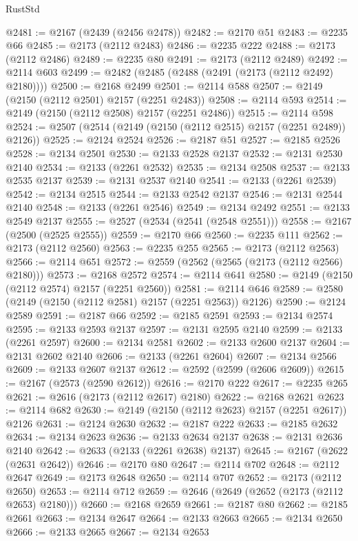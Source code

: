 \begin{lexlean}{RustStd}
\begin{coremodule}
@2481 := @2167 (@2439 (@2456 @2478))
@2482 := @2170 @51
@2483 := @2235 @66
@2485 := @2173 (@2112 @2483)
@2486 := @2235 @222
@2488 := @2173 (@2112 @2486)
@2489 := @2235 @80
@2491 := @2173 (@2112 @2489)
@2492 := @2114 @603
@2499 := @2482 (@2485 (@2488 (@2491 (@2173 (@2112 @2492) @2180))))
@2500 := @2168 @2499
@2501 := @2114 @588
@2507 := @2149 (@2150 (@2112 @2501) @2157 (@2251 @2483))
@2508 := @2114 @593
@2514 := @2149 (@2150 (@2112 @2508) @2157 (@2251 @2486))
@2515 := @2114 @598
@2524 := @2507 (@2514 (@2149 (@2150 (@2112 @2515) @2157 (@2251 @2489)) @2126))
@2525 := @2124 @2524
@2526 := @2187 @51
@2527 := @2185 @2526
@2528 := @2134 @2501
@2530 := @2133 @2528 @2137
@2532 := @2131 @2530 @2140
@2534 := @2133 (@2261 @2532)
@2535 := @2134 @2508
@2537 := @2133 @2535 @2137
@2539 := @2131 @2537 @2140
@2541 := @2133 (@2261 @2539)
@2542 := @2134 @2515
@2544 := @2133 @2542 @2137
@2546 := @2131 @2544 @2140
@2548 := @2133 (@2261 @2546)
@2549 := @2134 @2492
@2551 := @2133 @2549 @2137
@2555 := @2527 (@2534 (@2541 (@2548 @2551)))
@2558 := @2167 (@2500 (@2525 @2555))
@2559 := @2170 @66
@2560 := @2235 @111
@2562 := @2173 (@2112 @2560)
@2563 := @2235 @255
@2565 := @2173 (@2112 @2563)
@2566 := @2114 @651
@2572 := @2559 (@2562 (@2565 (@2173 (@2112 @2566) @2180)))
@2573 := @2168 @2572
@2574 := @2114 @641
@2580 := @2149 (@2150 (@2112 @2574) @2157 (@2251 @2560))
@2581 := @2114 @646
@2589 := @2580 (@2149 (@2150 (@2112 @2581) @2157 (@2251 @2563)) @2126)
@2590 := @2124 @2589
@2591 := @2187 @66
@2592 := @2185 @2591
@2593 := @2134 @2574
@2595 := @2133 @2593 @2137
@2597 := @2131 @2595 @2140
@2599 := @2133 (@2261 @2597)
@2600 := @2134 @2581
@2602 := @2133 @2600 @2137
@2604 := @2131 @2602 @2140
@2606 := @2133 (@2261 @2604)
@2607 := @2134 @2566
@2609 := @2133 @2607 @2137
@2612 := @2592 (@2599 (@2606 @2609))
@2615 := @2167 (@2573 (@2590 @2612))
@2616 := @2170 @222
@2617 := @2235 @265
@2621 := @2616 (@2173 (@2112 @2617) @2180)
@2622 := @2168 @2621
@2623 := @2114 @682
@2630 := @2149 (@2150 (@2112 @2623) @2157 (@2251 @2617)) @2126
@2631 := @2124 @2630
@2632 := @2187 @222
@2633 := @2185 @2632
@2634 := @2134 @2623
@2636 := @2133 @2634 @2137
@2638 := @2131 @2636 @2140
@2642 := @2633 (@2133 (@2261 @2638) @2137)
@2645 := @2167 (@2622 (@2631 @2642))
@2646 := @2170 @80
@2647 := @2114 @702
@2648 := @2112 @2647
@2649 := @2173 @2648
@2650 := @2114 @707
@2652 := @2173 (@2112 @2650)
@2653 := @2114 @712
@2659 := @2646 (@2649 (@2652 (@2173 (@2112 @2653) @2180)))
@2660 := @2168 @2659
@2661 := @2187 @80
@2662 := @2185 @2661
@2663 := @2134 @2647
@2664 := @2133 @2663
@2665 := @2134 @2650
@2666 := @2133 @2665
@2667 := @2134 @2653

\end{coremodule}
\end{lexlean}
